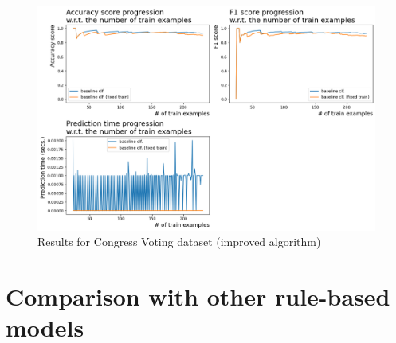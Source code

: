 \documentclass[12pt]{report}
\begin{document}
    \begin{figure}[H]
      \centering
      \includegraphics[scale=0.45]{./images/Classifier_comparison_improved_algo_congress.png}
      \caption{Results for Congress Voting dataset (improved algorithm)}
      \label{fig:congress_improved}
    \end{figure}
\section{Comparison with other rule-based models}
\end{document}
